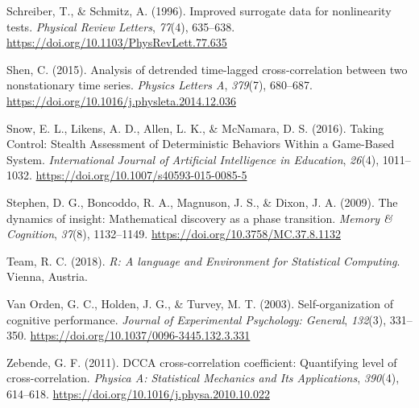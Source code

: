 \documentclass[
  man]{apa6}
\newlength{\cslhangindent}
\newlength{\cslentryspacingunit} %
\newenvironment{CSLReferences}[2] %
 {%
  \setlength{\parindent}{0pt}
  \ifodd #1
  \let\oldpar\par
  \def\par{\hangindent=\cslhangindent\oldpar}
  \fi
  \setlength{\parskip}{#2\cslentryspacingunit}
 }%
 {}
\begin{document}
\begin{CSLReferences}{1}{0}
\leavevmode{}%
Schreiber, T., \& Schmitz, A. (1996). Improved surrogate data for nonlinearity tests. \emph{Physical Review Letters}, \emph{77}(4), 635--638. \url{https://doi.org/10.1103/PhysRevLett.77.635}

\leavevmode{}%
Shen, C. (2015). Analysis of detrended time-lagged cross-correlation between two nonstationary time series. \emph{Physics Letters A}, \emph{379}(7), 680--687. \url{https://doi.org/10.1016/j.physleta.2014.12.036}

\leavevmode{}%
Snow, E. L., Likens, A. D., Allen, L. K., \& McNamara, D. S. (2016). Taking Control: Stealth Assessment of Deterministic Behaviors Within a Game-Based System. \emph{International Journal of Artificial Intelligence in Education}, \emph{26}(4), 1011--1032. \url{https://doi.org/10.1007/s40593-015-0085-5}

\leavevmode{}%
Stephen, D. G., Boncoddo, R. A., Magnuson, J. S., \& Dixon, J. A. (2009). The dynamics of insight: {Mathematical} discovery as a phase transition. \emph{Memory \& Cognition}, \emph{37}(8), 1132--1149. \url{https://doi.org/10.3758/MC.37.8.1132}

\leavevmode{}%
Team, R. C. (2018). \emph{R: {A} language and {Environment} for {Statistical} {Computing}}. Vienna, Austria.

\leavevmode{}%
Van Orden, G. C., Holden, J. G., \& Turvey, M. T. (2003). Self-organization of cognitive performance. \emph{Journal of Experimental Psychology: General}, \emph{132}(3), 331--350. \url{https://doi.org/10.1037/0096-3445.132.3.331}

\leavevmode{}%
Zebende, G. F. (2011). {DCCA} cross-correlation coefficient: {Quantifying} level of cross-correlation. \emph{Physica A: Statistical Mechanics and Its Applications}, \emph{390}(4), 614--618. \url{https://doi.org/10.1016/j.physa.2010.10.022}

\end{CSLReferences}

\endgroup
\end{document}

